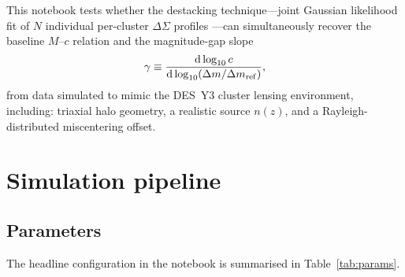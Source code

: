 \documentclass[11pt,a4paper]{article}
\newcommand{\dsig}{\Delta\Sigma}
\newcommand{\dm}{\Delta m}
\begin{document}
This notebook tests whether the destacking technique—joint Gaussian likelihood
fit of $N$ individual per-cluster $\dsig$ profiles
\citep{Vitorelli2025}—can simultaneously recover the baseline
$M$--$c$ relation and the magnitude-gap slope
\begin{equation}
  \gamma \equiv \frac{\mathrm{d}\log_{10}c}{\mathrm{d}\log_{10}(\dm/\dm_{\rm ref})},
  \label{eq:gamma_def}
\end{equation}
from data simulated to mimic the DES~Y3 cluster lensing environment, including:
triaxial halo geometry, a realistic source $n(z)$, and a Rayleigh-distributed
miscentering offset.

\section{Simulation pipeline}

\subsection{Parameters}

The headline configuration in the notebook is summarised in
Table~\ref{tab:params}.
\end{document}
